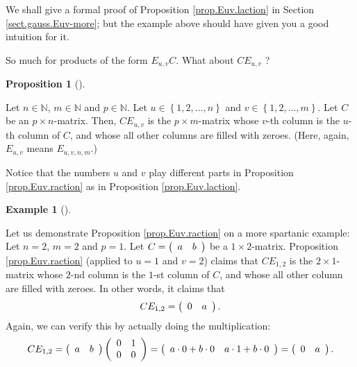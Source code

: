 \documentclass[numbers=enddot,12pt,final,onecolumn,notitlepage]{scrartcl}%
\theoremstyle{definition}
\newtheorem{prop}[theo]{Proposition}
\newenvironment{proposition}[1][]
{\begin{prop}[#1]\begin{leftbar}}
{\end{leftbar}\end{prop}}
\newtheorem{exam}[theo]{Example}
\newenvironment{example}[1][]
{\begin{exam}[#1]\begin{leftbar}}
{\end{leftbar}\end{exam}}
\begin{document}
We shall give a formal proof of Proposition \ref{prop.Euv.laction} in Section
\ref{sect.gauss.Euv-more}; but the example above should have given you a good
intuition for it.

So much for products of the form $E_{u,v}C$. What about $CE_{u,v}$ ?

\begin{proposition}
\label{prop.Euv.raction}Let $n\in\mathbb{N}$, $m\in\mathbb{N}$ and
$p\in\mathbb{N}$. Let $u\in\left\{  1,2,\ldots,n\right\}  $ and $v\in\left\{
1,2,\ldots,m\right\}  $. Let $C$ be an $p\times n$-matrix. Then, $CE_{u,v}$ is
the $p\times m$-matrix whose $v$-th column is the $u$-th column of $C$, and
whose all other columns are filled with zeroes. (Here, again, $E_{u,v}$ means
$E_{u,v,n,m}$.)
\end{proposition}

Notice that the numbers $u$ and $v$ play different parts in Proposition
\ref{prop.Euv.raction} as in Proposition \ref{prop.Euv.laction}.

\begin{example}
Let us demonstrate Proposition \ref{prop.Euv.raction} on a more spartanic
example: Let $n=2$, $m=2$ and $p=1$. Let $C=\left(
\begin{array}
[c]{cc}%
a & b
\end{array}
\right)  $ be a $1\times2$-matrix. Proposition \ref{prop.Euv.raction} (applied
to $u=1$ and $v=2$) claims that $CE_{1,2}$ is the $2\times1$-matrix whose
$2$-nd column is the $1$-st column of $C$, and whose all other column are
filled with zeroes. In other words, it claims that%
\[
CE_{1,2}=\left(
\begin{array}
[c]{cc}%
0 & a
\end{array}
\right)  .
\]
Again, we can verify this by actually doing the multiplication:%
\[
CE_{1,2}=\left(
\begin{array}
[c]{cc}%
a & b
\end{array}
\right)  \left(
\begin{array}
[c]{cc}%
0 & 1\\
0 & 0
\end{array}
\right)  =\left(
\begin{array}
[c]{cc}%
a\cdot0+b\cdot0 & a\cdot1+b\cdot0
\end{array}
\right)  =\left(
\begin{array}
[c]{cc}%
0 & a
\end{array}
\right)  .
\]

\end{example}
\end{document}
